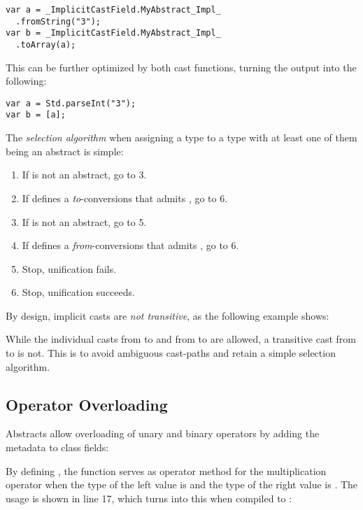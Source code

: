 \begin{lstlisting}
var a = _ImplicitCastField.MyAbstract_Impl_
  .fromString("3");
var b = _ImplicitCastField.MyAbstract_Impl_
  .toArray(a);
\end{lstlisting}
This can be further optimized by  both cast functions, turning the output into the following:

\begin{lstlisting}
var a = Std.parseInt("3");
var b = [a];
\end{lstlisting}
The \emph{selection algorithm} when assigning a type  to a type  with at least one of them being an abstract is simple:

\begin{enumerate}
	\item If  is not an abstract, go to 3.
	\item If  defines a \emph{to}-conversions that admits , go to 6.
	\item If  is not an abstract, go to 5.
	\item If  defines a \emph{from}-conversions that admits , go to 6.
	\item Stop, unification fails.
	\item Stop, unification succeeds.
\end{enumerate}



By design, implicit casts are \emph{not transitive}, as the following example shows:

While the individual casts from  to  and from  to  are allowed, a transitive cast from  to  is not. This is to avoid ambiguous cast-paths and retain a simple selection algorithm. 




\subsection{Operator Overloading}
\label{types-abstract-operator-overloading}

Abstracts allow overloading of unary and binary operators by adding the  metadata to class fields:

By defining , the function  serves as operator method for the multiplication \expr{*} operator when the type of the left value is  and the type of the right value is . The usage is shown in line 17, which turns into this when compiled to :

